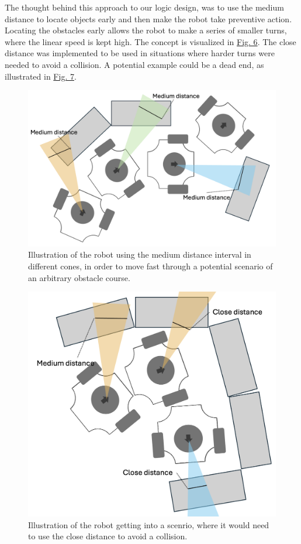 \documentclass[conference]{IEEEtran}
\begin{document}
The thought behind this approach to our logic design, was to use the medium distance to locate objects early and then make the robot take preventive action.
Locating the obstacles early allows the robot to make a series of smaller turns, where the linear speed is kept high. The concept is visualized in \href{sec:medium aviodance}{Fig. 6}.
The close distance was implemented to be used in situations where harder turns were needed to avoid a collision. A potential example could be a dead end, as illustrated in \href{sec:close aviodance}{Fig. 7}.
\begin{figure}[b]
    \centerline{\includegraphics[width=1.0\columnwidth]{Pictures/Medium Distance Aviodance.png}}
    \caption{Illustration of the robot using the medium distance interval in different cones, in order to move fast through a potential scenario of an arbitrary obstacle course.}
    \label{sec:medium aviodance}
    \end{figure}
\begin{figure}[htbp]
    \centerline{\includegraphics[width=1.0\columnwidth]{Pictures/Close Distance Avoidance.png}}
    \caption{Illustration of the robot getting into a scenrio, where it would need to use the close distance to avoid a collision.}
    \label{sec:close aviodance}
    \end{figure}
\end{document}
